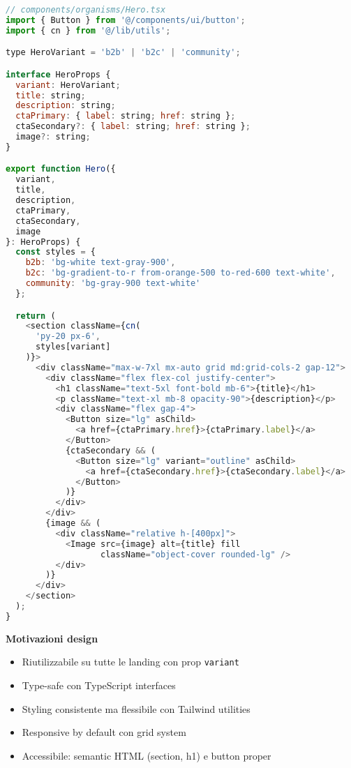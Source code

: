 \begin{lstlisting}[language=JavaScript, caption=Hero Component con varianti]
// components/organisms/Hero.tsx
import { Button } from '@/components/ui/button';
import { cn } from '@/lib/utils';

type HeroVariant = 'b2b' | 'b2c' | 'community';

interface HeroProps {
  variant: HeroVariant;
  title: string;
  description: string;
  ctaPrimary: { label: string; href: string };
  ctaSecondary?: { label: string; href: string };
  image?: string;
}

export function Hero({ 
  variant, 
  title, 
  description, 
  ctaPrimary, 
  ctaSecondary,
  image 
}: HeroProps) {
  const styles = {
    b2b: 'bg-white text-gray-900',
    b2c: 'bg-gradient-to-r from-orange-500 to-red-600 text-white',
    community: 'bg-gray-900 text-white'
  };

  return (
    <section className={cn(
      'py-20 px-6',
      styles[variant]
    )}>
      <div className="max-w-7xl mx-auto grid md:grid-cols-2 gap-12">
        <div className="flex flex-col justify-center">
          <h1 className="text-5xl font-bold mb-6">{title}</h1>
          <p className="text-xl mb-8 opacity-90">{description}</p>
          <div className="flex gap-4">
            <Button size="lg" asChild>
              <a href={ctaPrimary.href}>{ctaPrimary.label}</a>
            </Button>
            {ctaSecondary && (
              <Button size="lg" variant="outline" asChild>
                <a href={ctaSecondary.href}>{ctaSecondary.label}</a>
              </Button>
            )}
          </div>
        </div>
        {image && (
          <div className="relative h-[400px]">
            <Image src={image} alt={title} fill 
                   className="object-cover rounded-lg" />
          </div>
        )}
      </div>
    </section>
  );
}
\end{lstlisting}

\textbf{Motivazioni design}
\begin{itemize}
  \item Riutilizzabile su tutte le landing con prop \texttt{variant}
  \item Type-safe con TypeScript interfaces
  \item Styling consistente ma flessibile con Tailwind utilities
  \item Responsive by default con grid system
  \item Accessibile: semantic HTML (section, h1) e button proper
\end{itemize}

